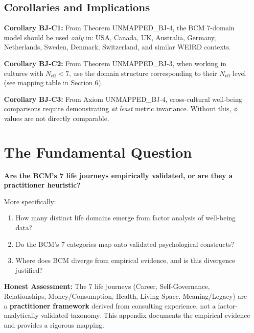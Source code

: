 \subsection{Corollaries and Implications}

\textbf{Corollary BJ-C1:} From Theorem UNMAPPED_BJ-4, the BCM 7-domain model should be used \textit{only} in:
USA, Canada, UK, Australia, Germany, Netherlands, Sweden, Denmark, Switzerland, and similar WEIRD contexts.

\textbf{Corollary BJ-C2:} From Theorem UNMAPPED_BJ-3, when working in cultures with $N_{\text{eff}} < 7$,
use the domain structure corresponding to their $N_{\text{eff}}$ level (see mapping table in Section 6).

\textbf{Corollary BJ-C3:} From Axiom UNMAPPED_BJ-4, cross-cultural well-being comparisons require
demonstrating \textit{at least} metric invariance. Without this, $\phi$ values are not directly comparable.


\section{The Fundamental Question}
\label{sec:bj-fundamental}

\begin{tcolorbox}[colback=red!5!white, colframe=red!75!black, title=Central Question]
\textbf{Are the BCM's 7 life journeys empirically validated, or are they a practitioner heuristic?}

More specifically:
\begin{enumerate}[nosep]
\item How many distinct life domains emerge from factor analysis of well-being data?
\item Do the BCM's 7 categories map onto validated psychological constructs?
\item Where does BCM diverge from empirical evidence, and is this divergence justified?
\end{enumerate}
\end{tcolorbox}

\textbf{Honest Assessment:} The 7 life journeys (Career, Self-Governance, Relationships, Money/Consumption, Health, Living Space, Meaning/Legacy) are a \textbf{practitioner framework} derived from consulting experience, not a factor-analytically validated taxonomy. This appendix documents the empirical evidence and provides a rigorous mapping.

